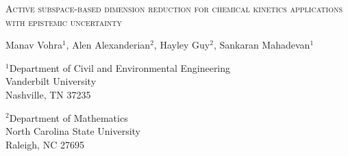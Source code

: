 \begin{center}
\textsc{Active subspace-based dimension reduction for chemical kinetics applications with epistemic uncertainty}

\bigskip 
\bigskip 

Manav Vohra$^{1}$, Alen Alexanderian$^{2}$, Hayley Guy$^{2}$, Sankaran Mahadevan$^{1}$

\bigskip
\bigskip

\normalsize
$^1$Department of Civil and Environmental Engineering\\
Vanderbilt University\\
Nashville, TN 37235\\

\bigskip

$^2$Department of Mathematics\\
North Carolina State University\\
Raleigh, NC 27695\\

%
\end{center}
%
%
%


